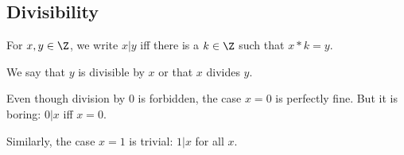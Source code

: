 \subsection{Divisibility}\label{sec:math:divisible}

\begin{definition}[Divisibility]
 For $x,y\in\Z$, we write $x|y$ iff there is a $k\in \Z$ such that $x*k=y$.
 
 We say that $y$ is divisible by $x$ or that $x$ divides $y$.
\end{definition}

\begin{remark}
Even though division by $0$ is forbidden, the case $x=0$ is perfectly fine.
But it is boring: $0|x$ iff $x=0$.

Similarly, the case $x=1$ is trivial: $1|x$ for all $x$.
\end{remark}

